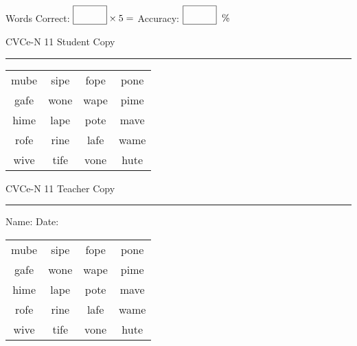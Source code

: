 \documentclass{memoir}
\begin{document}
\small

Words Correct: $\fbox{\phantom{\huge 100}} \times 5 = $ Accuracy: $\fbox{\phantom{\huge 100}}\;\; \%$ 

\vfill

\newpage


\footnotesize \noindent
CVCe-N 11 \hfill Student Copy
\smallskip
\hrule

\Large

\setlength{\tabcolsep}{14pt}
\def\arraystretch{2}

{\selectfont


\begin{vplace}[0.5]
\begin{center}
\begin{tabular}{cccc}
mube & sipe & fope & pone \\
gafe & wone & wape & pime \\
hime & lape & pote & mave \\
rofe & rine & lafe & wame \\
wive & tife & vone & hute \\
\end{tabular}
\end{center}
\end{vplace}

}

\newpage

\footnotesize \noindent
CVCe-N 11 \hfill Teacher Copy
\smallskip
\hrule

\small

\vfill

\noindent
Name: \underline{\hspace{1.75in}} \hfill Date: \underline{\hspace{1in}}

\Large

{\selectfont


\begin{vplace}[0.5]
\begin{center}
\begin{tabular}{cccc}
mube & sipe & fope & pone \\
gafe & wone & wape & pime \\
hime & lape & pote & mave \\
rofe & rine & lafe & wame \\
wive & tife & vone & hute \\
\end{tabular}
\end{center}
\end{vplace}



}
\end{document}
